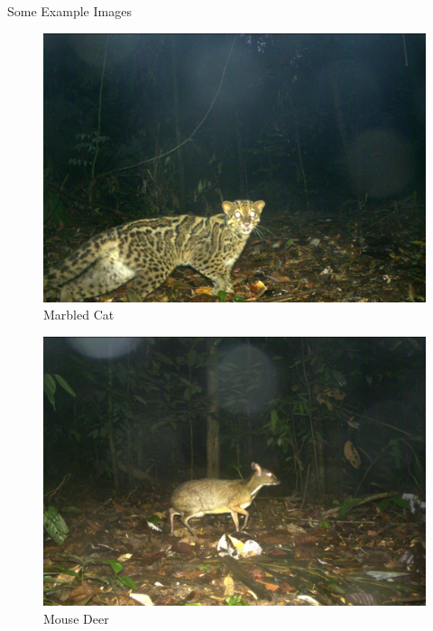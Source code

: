 \documentclass[10pt]{beamer}
\begin{document}
\begin{frame}{Some Example Images}		
	\centering
	\begin{minipage}[c]{0.48\linewidth}
		\begin{figure}
			\includegraphics[width=\linewidth,height=\textheight,keepaspectratio]{images/example_marbled_cat.JPG}
			\caption{Marbled Cat}
		\end{figure}
	\end{minipage}
	\hfill
	\begin{minipage}[c]{0.48\linewidth}
		\begin{figure}
			\includegraphics[width=\linewidth,height=.8\textheight,keepaspectratio]{images/example_mouse_deer.JPG}
			\caption{Mouse Deer}
		\end{figure}
	\end{minipage}
\end{frame}
\end{document}
